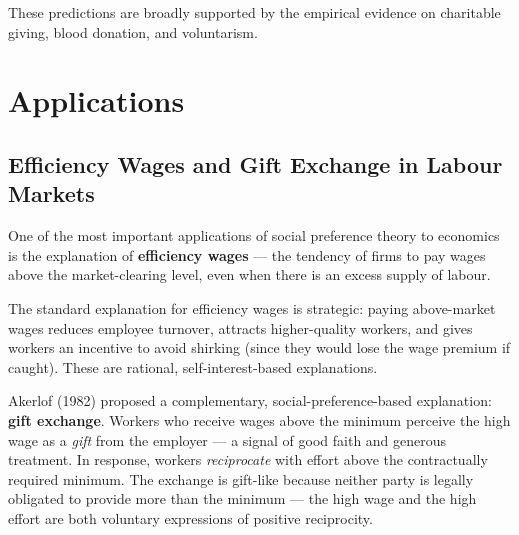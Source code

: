 \documentclass[12pt, letterpaper]{article}
\begin{document}
These predictions are broadly supported by the empirical evidence on charitable giving, blood donation, and voluntarism.

\medskip


\section{Applications}



\subsection{Efficiency Wages and Gift Exchange in Labour Markets}


One of the most important applications of social preference theory to economics is the explanation of \textbf{efficiency wages} --- the tendency of firms to pay wages above the market-clearing level, even when there is an excess supply of labour.

The standard explanation for efficiency wages is strategic: paying above-market wages reduces employee turnover, attracts higher-quality workers, and gives workers an incentive to avoid shirking (since they would lose the wage premium if caught). These are rational, self-interest-based explanations.

Akerlof (1982) proposed a complementary, social-preference-based explanation: \textbf{gift exchange}. Workers who receive wages above the minimum perceive the high wage as a \textit{gift} from the employer --- a signal of good faith and generous treatment. In response, workers \textit{reciprocate} with effort above the contractually required minimum. The exchange is gift-like because neither party is legally obligated to provide more than the minimum --- the high wage and the high effort are both voluntary expressions of positive reciprocity.
\end{document}
